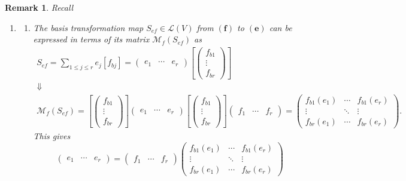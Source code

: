 \documentclass[aps,preprint]{revtex4}
\newtheorem{remark}[theorem]{Remark}
\begin{document}
\begin{remark}
\label{Forms of Basis Transformation Maps} Recall

\begin{enumerate}
\item 
\begin{enumerate}
\item The basis transformation map $S_{ef}\in \mathcal{L}\left( V\right) $
from $\left( \boldsymbol{f}\right) $ to $\left( \boldsymbol{e}\right) $ can
be expressed in terms of its matrix $\mathcal{M}_{f}\left( S_{ef}\right) $
as 
\begin{gather}
S_{ef}=\sum_{1\leq j\leq r}e_{j}\left[ f_{bj}\right] =\left( 
\begin{array}{ccc}
e_{1} & \cdots & e_{r}%
\end{array}%
\right) \left[ \left( 
\begin{array}{c}
f_{b1} \\ 
\vdots \\ 
f_{br}%
\end{array}%
\right) \right] \\
\Downarrow \\
\mathcal{M}_{f}\left( S_{ef}\right) =\left[ \left( 
\begin{array}{c}
f_{b1} \\ 
\vdots \\ 
f_{br}%
\end{array}%
\right) \right] \left( 
\begin{array}{ccc}
e_{1} & \cdots & e_{r}%
\end{array}%
\right) \left[ \left( 
\begin{array}{c}
f_{b1} \\ 
\vdots \\ 
f_{br}%
\end{array}%
\right) \right] \left( 
\begin{array}{ccc}
f_{1} & \cdots & f_{r}%
\end{array}%
\right) =\left( 
\begin{array}{ccc}
f_{b1}\left( e_{1}\right) & \cdots & f_{b1}\left( e_{r}\right) \\ 
\vdots & \ddots & \vdots \\ 
f_{br}\left( e_{1}\right) & \cdots & f_{br}\left( e_{r}\right)%
\end{array}%
\right) .
\end{gather}%
This gives 
\begin{equation}
\left( 
\begin{array}{ccc}
e_{1} & \cdots & e_{r}%
\end{array}%
\right) =\left( 
\begin{array}{ccc}
f_{1} & \cdots & f_{r}%
\end{array}%
\right) \left( 
\begin{array}{ccc}
f_{b1}\left( e_{1}\right) & \cdots & f_{b1}\left( e_{r}\right) \\ 
\vdots & \ddots & \vdots \\ 
f_{br}\left( e_{1}\right) & \cdots & f_{br}\left( e_{r}\right)%
\end{array}%
\right)
\end{equation}


\end{enumerate}
\end{enumerate}
\end{remark}
\end{document}

